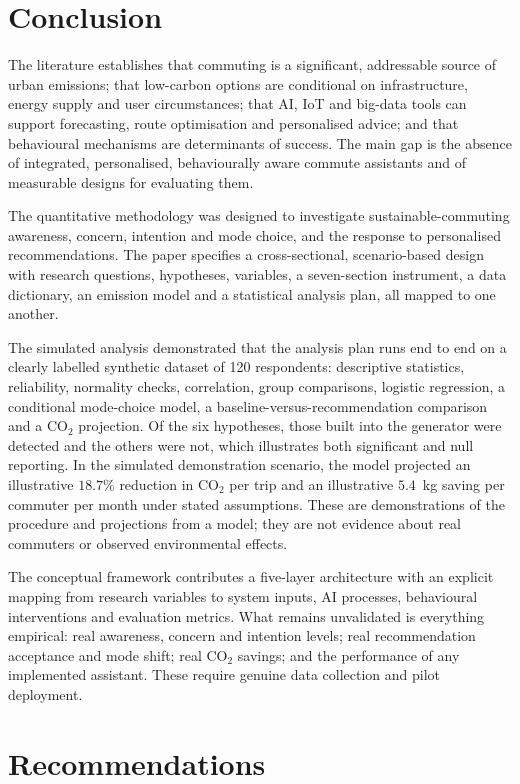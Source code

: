 \documentclass[11pt,a4paper]{article}
\begin{document}
\section{Conclusion}
The literature establishes that commuting is a significant, addressable source of urban emissions; that
low-carbon options are conditional on infrastructure, energy supply and user circumstances; that AI,
IoT and big-data tools can support forecasting, route optimisation and personalised advice; and that
behavioural mechanisms are determinants of success. The main gap is the absence of integrated,
personalised, behaviourally aware commute assistants and of measurable designs for evaluating them.

The quantitative methodology was designed to investigate sustainable-commuting awareness, concern,
intention and mode choice, and the response to personalised recommendations. The paper specifies a
cross-sectional, scenario-based design with research questions, hypotheses, variables, a seven-section
instrument, a data dictionary, an emission model and a statistical analysis plan, all mapped to one
another.

The simulated analysis demonstrated that the analysis plan runs end to end on a clearly labelled
synthetic dataset of 120 respondents: descriptive statistics, reliability, normality checks,
correlation, group comparisons, logistic regression, a conditional mode-choice model, a
baseline-versus-recommendation comparison and a CO$_2$ projection. Of the six hypotheses, those built
into the generator were detected and the others were not, which illustrates both significant and null
reporting. In the simulated demonstration scenario, the model projected an illustrative $18.7\%$
reduction in CO$_2$ per trip and an illustrative $5.4$~kg saving per commuter per month under stated
assumptions. These are demonstrations of the procedure and projections from a model; they are not
evidence about real commuters or observed environmental effects.

The conceptual framework contributes a five-layer architecture with an explicit mapping from research
variables to system inputs, AI processes, behavioural interventions and evaluation metrics. What
remains unvalidated is everything empirical: real awareness, concern and intention levels; real
recommendation acceptance and mode shift; real CO$_2$ savings; and the performance of any implemented
assistant. These require genuine data collection and pilot deployment.

\section{Recommendations}
\end{document}
